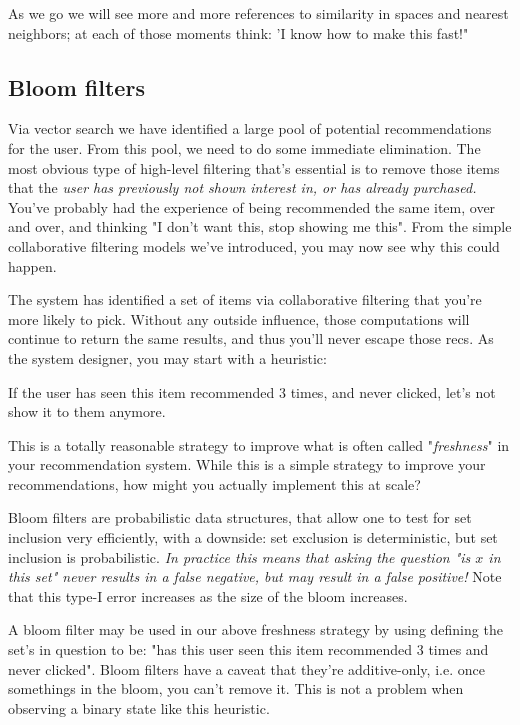 As we go we will see more and more references to similarity in spaces and nearest neighbors; at each of those moments think: 'I know how to make this fast!"

\subsection{Bloom filters}

Via vector search we have identified a large pool of potential recommendations for the user. From this pool, we need to do some immediate elimination. The most obvious type of high-level filtering that's essential is to remove those items that the \emph{user has previously not shown interest in, or has already purchased.} You've probably had the experience of being recommended the same item, over and over, and thinking "I don't want this, stop showing me this". From the simple collaborative filtering models we've introduced, you may now see why this could happen. 

The system has identified a set of items via collaborative filtering that you're more likely to pick. Without any outside influence, those computations will continue to return the same results, and thus you'll never escape those recs. As the system designer, you may start with a heuristic:

\vspace{10pt}
\colorbox{almond}{\parbox{\textwidth}{
If the user has seen this item recommended 3 times, and never clicked, let's not show it to them anymore.
}}
\vspace{10pt}

This is a totally reasonable strategy to improve what is often called "\emph{freshness}" in your recommendation system. While this is a simple strategy to improve your recommendations, how might you actually implement this at scale? 

Bloom filters are probabilistic data structures, that allow one to test for set inclusion very efficiently, with a downside: set exclusion is deterministic, but set inclusion is probabilistic. \emph{In practice this means that asking the question "is $x$ in this set" never results in a false negative, but may result in a false positive!} Note that this type-I error increases as the size of the bloom increases. 

A bloom filter may be used in our above freshness strategy by using defining the set's in question to be: "has this user seen this item recommended 3 times and never clicked". Bloom filters have a caveat that they're additive-only, i.e. once somethings in the bloom, you can't remove it. This is not a problem when observing a binary state like this heuristic.

